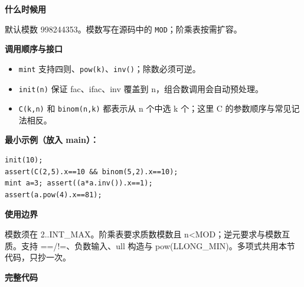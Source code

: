 \documentclass[UTF8,a4paper,10pt]{ctexart}
\newcommand{\TemplUsage}[1]{\textbf{什么时候用}\par #1\par}
\newcommand{\TemplApi}[1]{\textbf{调用顺序与接口}\par #1\par}
\newcommand{\TemplNote}[1]{\textbf{使用边界}\par #1\par}
\begin{document}
\TemplUsage{默认模数 998244353。模数写在源码中的 \texttt{MOD}；阶乘表按需扩容。}
\TemplApi{\begin{itemize}
\item \texttt{mint} 支持四则、\texttt{pow(k)}、\texttt{inv()}；除数必须可逆。
\item \texttt{init(n)} 保证 fac、ifac、inv 覆盖到 n，组合数调用会自动预处理。
\item \texttt{C(k,n)} 和 \texttt{binom(n,k)} 都表示从 n 个中选 k 个；这里 C 的参数顺序与常见记法相反。
\end{itemize}}
\textbf{最小示例（放入 main）：}
\begin{lstlisting}
init(10);
assert(C(2,5).x==10 && binom(5,2).x==10);
mint a=3; assert((a*a.inv()).x==1);
assert(a.pow(4).x==81);
\end{lstlisting}
\TemplNote{模数须在 2..INT\_MAX。阶乘表要求质数模数且 n<MOD；逆元要求与模数互质。支持 ==/!=、负数输入、ull 构造与 pow(LLONG\_MIN)。多项式共用本节代码，只抄一次。}
\textbf{完整代码}
\end{document}
